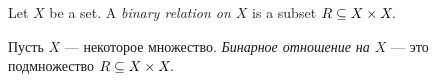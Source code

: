 \documentclass[../main/CT4S-EN-RU]{subfiles}
\begin{document}

\subsubsection{}

\begin{definitionENG}\label{def:binary relation}
Let $X$ be a set. A {\em binary relation on $X$} is a subset $R\ss X\times X.$ 
\end{definitionENG}

\begin{definitionRUS}\label{def:binary relation}
Пусть $X$ — некоторое множество. {\em Бинарное отношение на $X$} — это подмножество $R\ss X\times X.$ 
\end{definitionRUS}
\end{document}

